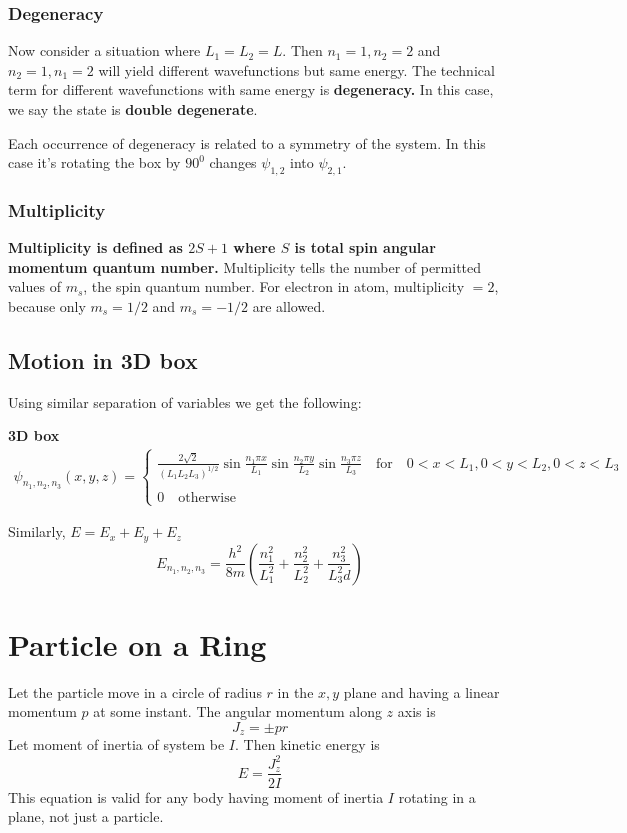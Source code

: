 \documentclass[11pt]{article}
\theoremstyle{definition}
\begin{document}
\subsubsection{Degeneracy}

Now consider a situation where $L_1 = L_2 = L$. Then $n_1 = 1, n_2 = 2$ and $n_2 = 1, n_1 = 2$ will yield different wavefunctions but same energy. The technical term for different wavefunctions with same energy is \textbf{degeneracy.} In this case, we say the state is \textbf{double degenerate}. 

Each occurrence of degeneracy is related to a symmetry of the system. In this case it's rotating the box by $90^0$ changes $\psi_{1,2}$ into $\psi_{2,1}$.

\subsubsection{Multiplicity}
\textbf{Multiplicity is defined as $2S+1$ where $S$ is total spin angular momentum quantum number.} Multiplicity tells the number of permitted values of $m_s$, the spin quantum number. For electron in atom, multiplicity $= 2$, because only $m_s = 1/2$ and $m_s = -1/2$ are allowed.
\subsection{Motion in 3D box}

Using similar separation of variables we get the following:
\begin{shaded}
\textbf{3D box}
\begin{gather*}
    \psi_{n_1, n_2, n_3}(x,y,z) = \begin{cases}
    \frac{2\sqrt{2}}{(L_1 L_2 L_3)^{1/2}} \sin{\frac{n_1 \pi x}{L_1}} \sin{\frac{n_2 \pi y}{L_2}} \sin{\frac{n_3 \pi z}{L_3}} \quad \text{for} \quad 0<x<L_1, 0<y<L_2, 0<z<L_3\\
    \\
    0 \quad \text{otherwise}
    \end{cases}
\end{gather*}

Similarly, $E = E_x + E_y + E_z$
\begin{equation*}
    E_{n_1, n_2,n_3} = \frac{h^2}{8m} \left(\frac{n_1^2}{L_1^2} + \frac{n_2^2}{L_2^2} + \frac{n_3^2}{L_3^2d}\right)
\end{equation*}
\end{shaded}

\section{Particle on a Ring}
Let the particle move in a circle of radius $r$ in the $x,y$ plane and having a linear momentum $p$ at some instant. The angular momentum along $z$ axis is $$J_z = \pm pr$$ Let moment of inertia of system be $I$. Then kinetic energy is $$E = \frac{J_z^2}{2I}$$ This equation is valid for any body having moment of inertia $I$ rotating in a plane, not just a particle.
\end{document}
